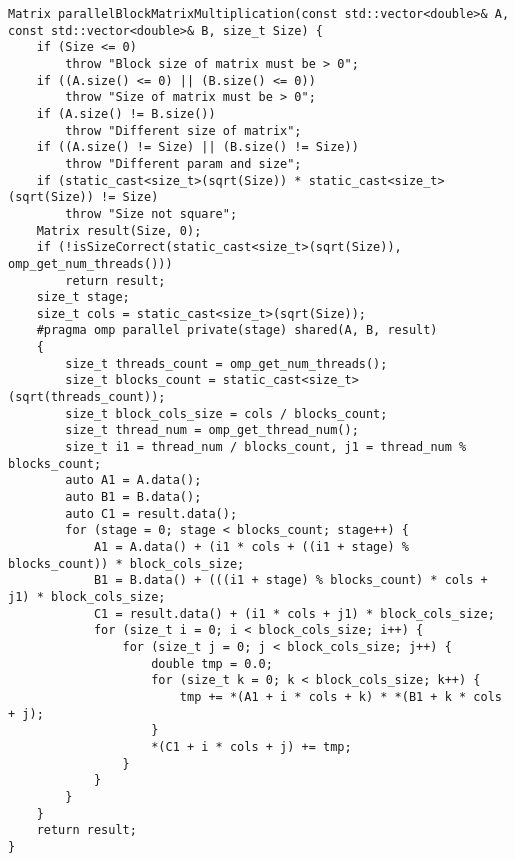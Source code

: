 \documentclass{report}
\begin{document}
\begin{lstlisting}
Matrix parallelBlockMatrixMultiplication(const std::vector<double>& A, const std::vector<double>& B, size_t Size) {
    if (Size <= 0)
        throw "Block size of matrix must be > 0";
    if ((A.size() <= 0) || (B.size() <= 0))
        throw "Size of matrix must be > 0";
    if (A.size() != B.size())
        throw "Different size of matrix";
    if ((A.size() != Size) || (B.size() != Size))
        throw "Different param and size";
    if (static_cast<size_t>(sqrt(Size)) * static_cast<size_t>(sqrt(Size)) != Size)
        throw "Size not square";
    Matrix result(Size, 0);
    if (!isSizeCorrect(static_cast<size_t>(sqrt(Size)),  omp_get_num_threads()))
        return result;
    size_t stage;
    size_t cols = static_cast<size_t>(sqrt(Size));
    #pragma omp parallel private(stage) shared(A, B, result)
    {
        size_t threads_count = omp_get_num_threads();
        size_t blocks_count = static_cast<size_t>(sqrt(threads_count));
        size_t block_cols_size = cols / blocks_count;
        size_t thread_num = omp_get_thread_num();
        size_t i1 = thread_num / blocks_count, j1 = thread_num % blocks_count;
        auto A1 = A.data();
        auto B1 = B.data();
        auto C1 = result.data();
        for (stage = 0; stage < blocks_count; stage++) {
            A1 = A.data() + (i1 * cols + ((i1 + stage) % blocks_count)) * block_cols_size;
            B1 = B.data() + (((i1 + stage) % blocks_count) * cols + j1) * block_cols_size;
            C1 = result.data() + (i1 * cols + j1) * block_cols_size;
            for (size_t i = 0; i < block_cols_size; i++) {
                for (size_t j = 0; j < block_cols_size; j++) {
                    double tmp = 0.0;
                    for (size_t k = 0; k < block_cols_size; k++) {
                        tmp += *(A1 + i * cols + k) * *(B1 + k * cols + j);
                    }
                    *(C1 + i * cols + j) += tmp;
                }
            }
        }
    }
    return result;
}

\end{lstlisting}
\end{document}
